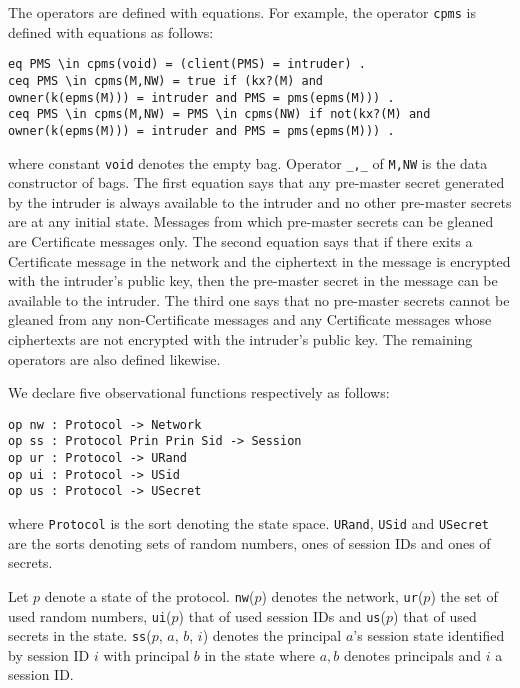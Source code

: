 \documentclass[a4paper,fleqn]{cas-dc}
\begin{document}
The operators are defined with equations. For example, the operator \verb!cpms! is defined with equations as follows:
\begin{small}
\begin{verbatim}
eq PMS \in cpms(void) = (client(PMS) = intruder) .
ceq PMS \in cpms(M,NW) = true if (kx?(M) and
owner(k(epms(M))) = intruder and PMS = pms(epms(M))) .
ceq PMS \in cpms(M,NW) = PMS \in cpms(NW) if not(kx?(M) and
owner(k(epms(M))) = intruder and PMS = pms(epms(M))) .
\end{verbatim}
\end{small}	
where constant \verb!void! denotes the empty bag. Operator    \verb|_,_| of \verb!M,NW! is the data constructor of bags. The first equation says that any pre-master secret generated by the intruder is always available to the intruder and no other pre-master secrets are at any initial state. Messages from which pre-master secrets can be gleaned are Certificate messages only. The second equation says that if there exits a Certificate message in the network and the ciphertext in the message is encrypted with the intruder’s public key, then the pre-master secret in the message can be available to the intruder. The third one says that no pre-master secrets cannot be gleaned from any non-Certificate messages and any Certificate messages whose ciphertexts are not encrypted with the intruder’s public key. The remaining operators are also defined likewise.

We declare five observational functions respectively as follows:
\begin{small}
\begin{verbatim}
op nw : Protocol -> Network
op ss : Protocol Prin Prin Sid -> Session
op ur : Protocol -> URand
op ui : Protocol -> USid
op us : Protocol -> USecret
\end{verbatim}
\end{small}	
where \verb!Protocol! is  the  sort  denoting  the  state  space. \verb!URand!, \verb!USid! and \verb!USecret! are the  sorts denoting sets of random numbers, ones of session IDs and ones of secrets. 

Let $p$ denote a state of the protocol. \verb!nw!($p$) denotes the network, \verb!ur!($p$) the set of used random numbers, \verb!ui!($p$) that of used session IDs and \verb!us!($p$) that of used secrets in the state. 
\verb!ss!($p$, $a$, $b$, $i$) denotes the principal $a$’s session state identified by session ID $i$ with principal $b$ in the state where $a, b$ denotes principals and $i$ a session ID.
\end{document}
